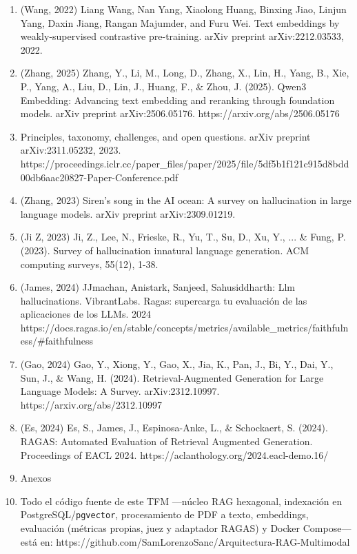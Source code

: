 \begin{enumerate}
\item (Wang, 2022) Liang Wang, Nan Yang, Xiaolong Huang, Binxing Jiao, Linjun Yang, Daxin Jiang, Rangan Majumder, and Furu Wei. Text embeddings by weakly-supervised contrastive pre-training. arXiv preprint arXiv:2212.03533, 2022.
\item (Zhang, 2025) Zhang, Y., Li, M., Long, D., Zhang, X., Lin, H., Yang, B., Xie, P., Yang, A., Liu, D., Lin, J., Huang, F., \& Zhou, J. (2025). Qwen3 Embedding: Advancing text embedding and reranking through foundation models. arXiv preprint arXiv:2506.05176. https://arxiv.org/abs/2506.05176
\item Principles, taxonomy, challenges, and open questions. arXiv preprint arXiv:2311.05232, 2023. https://proceedings.iclr.cc/paper\_files/paper/2025/file/5df5b1f121c915d8bdd00db6aac20827-Paper-Conference.pdf
\item (Zhang, 2023) Siren's song in the AI ocean: A survey on hallucination in large language models. arXiv preprint arXiv:2309.01219.
\item (Ji Z, 2023) Ji, Z., Lee, N., Frieske, R., Yu, T., Su, D., Xu, Y., ... \& Fung, P. (2023). Survey of hallucination innatural language generation. ACM computing surveys, 55(12), 1-38.
\item (James, 2024) JJmachan, Anistark, Sanjeed, Sahusiddharth: Llm hallucinations. VibrantLabs. Ragas: supercarga tu evaluación de las aplicaciones de los LLMs. 2024 https://docs.ragas.io/en/stable/concepts/metrics/available\_metrics/faithfulness/\#faithfulness
\item (Gao, 2024) Gao, Y., Xiong, Y., Gao, X., Jia, K., Pan, J., Bi, Y., Dai, Y., Sun, J., \& Wang, H. (2024). Retrieval-Augmented Generation for Large Language Models: A Survey. arXiv:2312.10997. https://arxiv.org/abs/2312.10997
\item (Es, 2024) Es, S., James, J., Espinosa-Anke, L., \& Schockaert, S. (2024). RAGAS: Automated Evaluation of Retrieval Augmented Generation. Proceedings of EACL 2024. https://aclanthology.org/2024.eacl-demo.16/
\item Anexos
\item Todo el código fuente de este TFM ---núcleo RAG hexagonal, indexación en PostgreSQL/\texttt{pgvector}, procesamiento de PDF a texto, embeddings, evaluación (métricas propias, juez y adaptador RAGAS) y Docker Compose--- está en: https://github.com/SamLorenzoSanc/Arquitectura-RAG-Multimodal
\end{enumerate}
